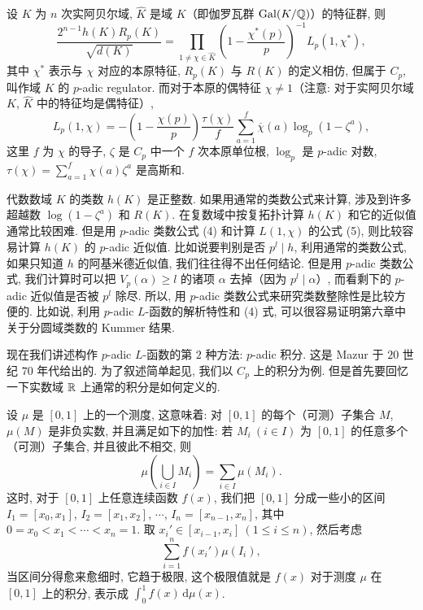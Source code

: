 \begin{theorem}\label{thm:9.18}
设 $K$ 为 $n$ 次实阿贝尔域, $\widehat{K}$ 是域 $K$（即伽罗瓦群 $\operatorname{Gal}(K/\mathbb{Q})$）的特征群, 则
\begin{equation}\tag{4}
  \frac{2^{n-1}h(K)R_p(K)}{\sqrt{d(K)}}
  =\prod_{1\neq\chi\in\widehat{K}}
  \left(1-\frac{\chi^*(p)}{p}\right)^{-1}L_p(1,\chi^*),
\end{equation}
其中 $\chi^*$ 表示与 $\chi$ 对应的本原特征, $R_p(K)$ 与 $R(K)$ 的定义相仿, 但属于 $C_p$, 叫作域 $K$ 的 $p$-adic regulator. 而对于本原的偶特征 $\chi\neq 1$（注意: 对于实阿贝尔域 $K$, $\widehat{K}$ 中的特征均是偶特征）,
\begin{equation}\tag{5}
  L_p(1,\chi)=-\left(1-\frac{\chi(p)}{p}\right)
  \frac{\tau(\chi)}{f}\sum_{a=1}^{f}\overline{\chi}(a)\log_p(1-\zeta^a),
\end{equation}
这里 $f$ 为 $\chi$ 的导子, $\zeta$ 是 $C_p$ 中一个 $f$ 次本原单位根, $\log_p$ 是 $p$-adic 对数, $\tau(\chi)=\sum_{a=1}^{f}\chi(a)\zeta^a$ 是高斯和.
\end{theorem}

代数数域 $K$ 的类数 $h(K)$ 是正整数. 如果用通常的类数公式来计算, 涉及到许多超越数 $\log(1-\zeta^a)$ 和 $R(K)$. 在复数域中按复拓扑计算 $h(K)$ 和它的近似值通常比较困难. 但是用 $p$-adic 类数公式 (4) 和计算 $L(1,\chi)$ 的公式 (5), 则比较容易计算 $h(K)$ 的 $p$-adic 近似值. 比如说要判别是否 $p^l\mid h$, 利用通常的类数公式, 如果只知道 $h$ 的阿基米德近似值, 我们往往得不出任何结论. 但是用 $p$-adic 类数公式, 我们计算时可以把 $V_p(\alpha)\geqslant l$ 的诸项 $\alpha$ 去掉（因为 $p^l\mid\alpha$）, 而看剩下的 $p$-adic 近似值是否被 $p^l$ 除尽. 所以, 用 $p$-adic 类数公式来研究类数整除性是比较方便的. 比如说, 利用 $p$-adic $L$-函数的解析特性和 (4) 式, 可以很容易证明第六章中关于分圆域类数的 Kummer 结果.

现在我们讲述构作 $p$-adic $L$-函数的第 $2$ 种方法: $p$-adic 积分. 这是 Mazur 于 $20$ 世纪 $70$ 年代给出的. 为了叙述简单起见, 我们以 $C_p$ 上的积分为例. 但是首先要回忆一下实数域 $\mathbb{R}$ 上通常的积分是如何定义的.

设 $\mu$ 是 $[0,1]$ 上的一个测度, 这意味着: 对 $[0,1]$ 的每个（可测）子集合 $M$, $\mu(M)$ 是非负实数, 并且满足如下的加性: 若 $M_i\ (i\in I)$ 为 $[0,1]$ 的任意多个（可测）子集合, 并且彼此不相交, 则
\[
  \mu\left(\bigcup_{i\in I}M_i\right)=\sum_{i\in I}\mu(M_i).
\]
这时, 对于 $[0,1]$ 上任意连续函数 $f(x)$, 我们把 $[0,1]$ 分成一些小的区间 $I_1=[x_0,x_1]$, $I_2=[x_1,x_2]$, $\cdots$, $I_n=[x_{n-1},x_n]$, 其中 $0=x_0<x_1<\cdots<x_n=1$. 取 $x_i'\in[x_{i-1},x_i]\ (1\leqslant i\leqslant n)$, 然后考虑
\[
  \sum_{i=1}^{n}f(x_i')\mu(I_i),
\]
当区间分得愈来愈细时, 它趋于极限, 这个极限值就是 $f(x)$ 对于测度 $\mu$ 在 $[0,1]$ 上的积分, 表示成 $\int_0^1 f(x)\,\mathrm{d}\mu(x)$.

